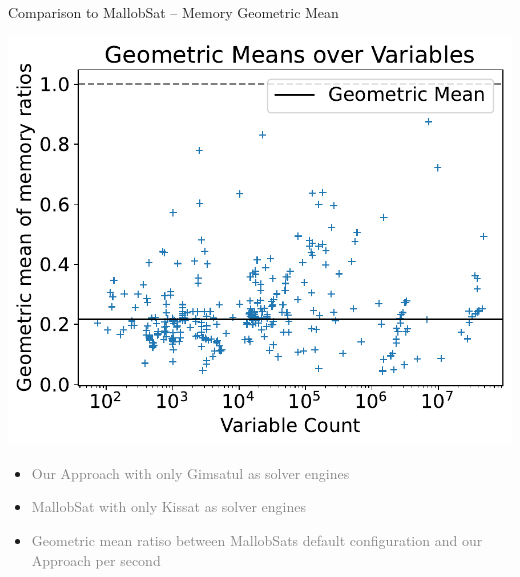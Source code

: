 \documentclass[]{sdqbeamer}
\begin{document}
\begin{frame}{Comparison to MallobSat -- Memory Geometric Mean}
    \begin{minipage}{.45\textwidth}
        \includegraphics[scale=.8]{plots/16node_compare/mem_gm_over_vars.pdf}    
    \end{minipage}
    \hfill
    \begin{minipage}{.45\textwidth}
        \begin{itemize}
            \item \textcolor{gray}{Our Approach with only Gimsatul as solver engines}
            \item \textcolor{gray}{MallobSat with only Kissat as solver engines}
            \item \textcolor{gray}{Geometric mean ratiso between MallobSats default configuration and our Approach per second}
        \end{itemize}
    \end{minipage}
\end{frame}
\end{document}
